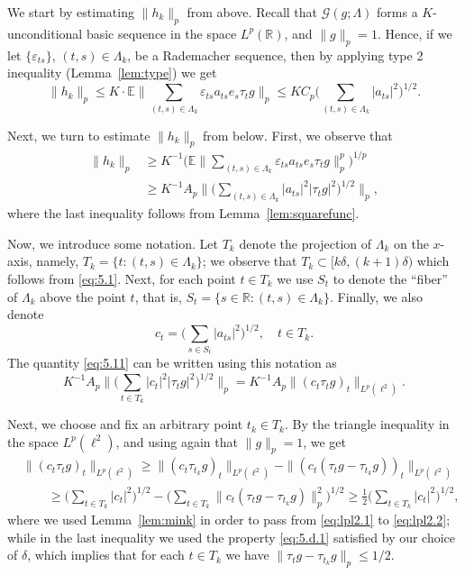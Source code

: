 \documentclass[reqno,a4paper,12pt]{amsart}
\numberwithin{equation}{section}
\numberwithin{figure}{section}
\newcommand\R{\mathbb{R}}
\newcommand\G{\mathcal{G}}
\newcommand\Lam{\Lambda}
\newcommand\1{\mathds{1}}
\newcommand\eps{\varepsilon}
\newcommand{\TTT}{T}
\newcommand{\SSS}{S}
\newcommand{\ts}{\tau}
\renewcommand\le{\leqslant}
\renewcommand\ge{\geqslant}
\newcommand\sbt{\subset}
\theoremstyle{plain}
\newcommand{\lemref}[1]{Lemma~\ref{#1}}
\theoremstyle{definition}
\begin{document}
We start by estimating $\|h_k\|_p$ from above.
Recall that $\G(g; \Lambda)$ forms a $K$-unconditional basic sequence
 in the space $L^p(\R)$, and $\|g\|_p = 1$. Hence, 
if  we let $\{ \eps_{ts} \}$,  $(t,s)\in\Lambda_k$,  be a Rademacher sequence, then
by applying type 2 inequality (\lemref{lem:type}) we get
\begin{equation}
\|h_{k}\|_p \le K \cdot \mathbb{E} \Big\|\sum_{(t,s)\in\Lambda_k} \eps_{ts} a_{ts} e_s \ts_t g \Big\|_p\le K C_p \Big( \sum_{(t,s)\in\Lambda_k}|a_{ts}|^2 \Big)^{1/2}.
\end{equation}

Next, we turn to estimate $\|h_k\|_p$ from below. First, we observe that
\begin{align}
\|h_{k}\|_p&\ge K^{-1} \Big(\mathbb{E} \Big\|\sum_{(t,s)\in\Lambda_k} \eps_{ts}  a_{ts} e_s \ts_t g \Big\|^p_p\Big)^{1/p} \label{eq:5.10.a} \\
&\ge K^{-1} A_p \Big\| \Big( \sum_{(t,s)\in\Lambda_k}|a_{ts}|^2 |\ts_t g|^2 \Big)^{1/2} \Big\|_p,
\label{eq:5.11}
\end{align}
where the last inequality follows from \lemref{lem:squarefunc}.

Now, we introduce some notation. Let
$\TTT_k$ denote the projection of $\Lambda_k$ on the $x$-axis, 
namely, $\TTT_k = \{t :  (t,s)\in\Lambda_k\}$; we observe that 
$\TTT_k  \sbt [k\delta, (k+1)\delta)$
which follows from \eqref{eq:5.1}.
 Next, for each point $t \in \TTT_k $  we use
 $\SSS_t$ to denote the ``fiber'' of $\Lam_k$ 
above the point $t$, that is,
$\SSS_t=\{s\in\R: (t,s)\in\Lambda_k\}$.
Finally, we also denote 
\begin{equation}
\label{eq:ct.def}
c_t = \Big( \sum_{s\in \SSS_t} |a_{ts}|^2 \Big)^{1/2}, \quad t \in \TTT_k.
\end{equation}
The quantity \eqref{eq:5.11} can be written using this notation as
\begin{equation}
\label{eq:5.10.b}
K^{-1} A_p \Big\| \Big( 
\sum_{t\in \TTT_k}|c_{t}|^2  |\ts_t g|^2 \Big)^{1/2} \Big\|_p
 = K^{-1} A_p  \|(c_t \ts_t g)_t\|_{L^p(\ell^2)}.
\end{equation}



Next, we choose and fix an arbitrary point
 $t_k \in \TTT_k$. By the triangle inequality in the space
$L^p(\ell^2)$, and using again that $\|g\|_p = 1$, we get
\begin{align}
&\|(c_t \ts_t g)_t\|_{L^p(\ell^2)} \ge 	\|(c_t \ts_{t_k} g)_t\|_{L^p(\ell^2)} - \|(c_t (\ts_t g - \ts_{t_k} g))_t\|_{L^p(\ell^2)} \label{eq:lpl2.1} \\
& \qquad \ge \Big( \sum_{t\in \TTT_k} |c_t|^2\Big)^{1/2} - \Big( \sum_{t\in \TTT_k} \|c_t  (\ts_t g - \ts_{t_k} g)\|_p^2 \Big)^{1/2}\ge \frac{1}{2}\Big( \sum_{t\in \TTT_k} |c_t|^2\Big)^{1/2}, \label{eq:lpl2.2}
\end{align}
where we used \lemref{lem:mink} in order to pass
from \eqref{eq:lpl2.1} to \eqref{eq:lpl2.2}; while in the last inequality we used the property \eqref{eq:5.d.1} satisfied by our choice of $\delta$, which implies that for each $t \in \TTT_k$ we have $\|\ts_t g - \ts_{t_k} g \|_p  \le 1/2$.
\end{document}
